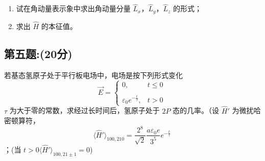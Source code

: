 \begin{enumerate}
    \item 试在角动量表示象中求出角动量分量 $\hat{L}_x$，$\hat{L}_y$，$\hat{L}_z$ 的形式；
    \item 求出 $\hat{H}$ 的本征值。
\end{enumerate}
\subsection{第五题:(20分)}
若基态氢原子处于平行板电场中，电场是按下列形式变化
$$\vec{E} = \begin{cases} 0, & t \leq 0 \\\\\varepsilon_0 e^{-\frac{t}{\tau}}, & t > 0\end{cases}~$$
$\tau$ 为大于零的常数，求经过长时间后，氢原子处于 $2P$ 态的几率。（设 $\hat{H}'$ 为微扰哈密顿算符，
$$\langle \hat{H}' \rangle_{100,210} = \frac{2^8}{\sqrt{2}} \frac{a\varepsilon_0 e}{3^5} e^{-\frac{t}{\tau}}~$$；(当  $t > 0 \langle \hat{H}' \rangle_{100,21\pm 1} = 0 $)
